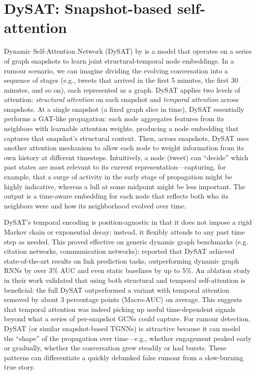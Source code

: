 \documentclass{cshonours}
\begin{document}
\section*{DySAT: Snapshot-based self-attention}
Dynamic Self-Attention Network (DySAT) by \cite{sankar2020dysat} is a model that operates on a series of graph snapshots to learn joint structural-temporal node embeddings. In a rumour scenario, we can imagine dividing the evolving conversation into a sequence of stages (e.g., tweets that arrived in the first 5 minutes, the first 30 minutes, and so on), each represented as a graph. DySAT applies two levels of attention: \emph{structural attention} on each snapshot and \emph{temporal attention} across snapshots. At a single snapshot (a fixed graph slice in time), DySAT essentially performs a GAT-like propagation: each node aggregates features from its neighbors with learnable attention weights, producing a node embedding that captures that snapshot’s structural context. Then, across snapshots, DySAT uses another attention mechanism to allow each node to weight information from its own history at different timesteps. Intuitively, a node (tweet) can “decide” which past states are most relevant to its current representation—capturing, for example, that a surge of activity in the early stage of propagation might be highly indicative, whereas a lull at some midpoint might be less important. The output is a time-aware embedding for each node that reflects both who its neighbors were and how its neighborhood evolved over time. 

DySAT’s temporal encoding is position-agnostic in that it does not impose a rigid Markov chain or exponential decay; instead, it flexibly attends to any past time step as needed. This proved effective on generic dynamic graph benchmarks (e.g. citation networks, communication networks): \cite{sankar2020dysat} reported that DySAT achieved state-of-the-art results on link prediction tasks, outperforming dynamic graph RNNs by over 3\% AUC and even static baselines by up to 5\%. An ablation study in their work validated that using both structural and temporal self-attention is beneficial: the full DySAT outperformed a variant with temporal attention removed by about 3 percentage points (Macro-AUC) on average. This suggests that temporal attention was indeed picking up useful time-dependent signals beyond what a series of per-snapshot GCNs could capture. For rumour detection, DySAT (or similar snapshot-based TGNNs) is attractive because it can model the “shape” of the propagation over time—e.g., whether engagement peaked early or gradually, whether the conversation grew steadily or had bursts. These patterns can differentiate a quickly debunked false rumour from a slow-burning true story.
\end{document}
